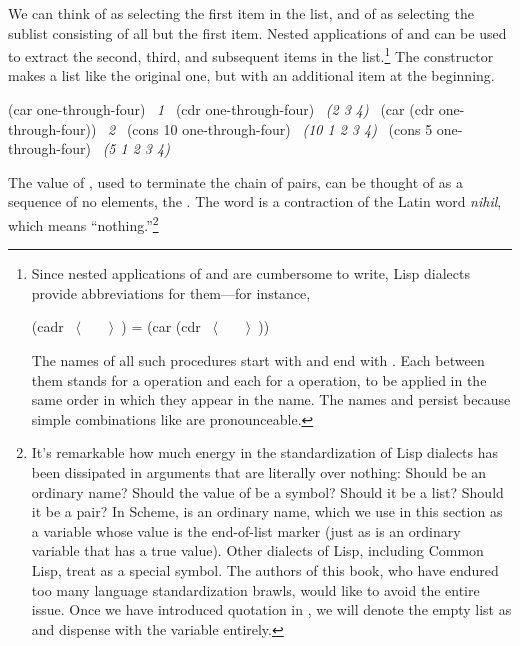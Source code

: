 We can think of  as selecting the first item in the list, and of
 as selecting the sublist consisting of all but the first item.
Nested applications of  and  can be used to extract the
second, third, and subsequent items in the list.\footnote{Since nested
applications of  and  are cumbersome to write, Lisp
dialects provide abbreviations for them---for instance,

\begin{compactCodeBlock}
(cadr ~\(\langle \)~~~~\(\rangle \)~) = (car (cdr ~\(\langle \)~~~~\(\rangle \)~))
\end{compactCodeBlock}

The names of all such procedures start with  and end with .
Each  between them stands for a  operation and each 
for a  operation, to be applied in the same order in which they
appear in the name.  The names  and  persist because simple
combinations like  are pronounceable.} The constructor 
makes a list like the original one, but with an additional item at the
beginning.

\begin{codeBlock}
(car one-through-four)
~\textit{1}~
(cdr one-through-four)
~\textit{(2 3 4)}~
(car (cdr one-through-four))
~\textit{2}~
(cons 10 one-through-four)
~\textit{(10 1 2 3 4)}~
(cons 5 one-through-four)
~\textit{(5 1 2 3 4)}~
\end{codeBlock}

\noindent
The value of , used to terminate the chain of pairs, can be thought
of as a sequence of no elements, the .  The word
 is a contraction of the Latin word \emph{nihil}, which means
``nothing.''\footnote{It's remarkable how much energy in the standardization of
Lisp dialects has been dissipated in arguments that are literally over nothing:
Should  be an ordinary name?  Should the value of  be a
symbol?  Should it be a list?  Should it be a pair?  In Scheme,  is
an ordinary name, which we use in this section as a variable whose value is the
end-of-list marker (just as  is an ordinary variable that has a true
value).  Other dialects of Lisp, including Common Lisp, treat  as a
special symbol.  The authors of this book, who have endured too many language
standardization brawls, would like to avoid the entire issue.  Once we have
introduced quotation in , we will denote the empty list as
 and dispense with the variable  entirely.}

